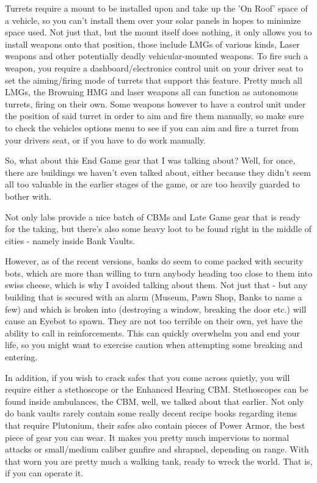 Turrets require a mount to be installed upon and take up the 'On Roof' space of a vehicle, so you can't install them over your solar panels in hopes to minimize space used. Not just that, but the mount itself does nothing, it only allows you to install weapons onto that position, those include LMGs of various kinds, Laser weapons and other potentially deadly vehicular-mounted weapons. To fire such a weapon, you require a dashboard/electronics control unit on your driver seat to set the aiming/firing mode of turrets that support this feature. Pretty much all LMGs, the Browning HMG and laser weapons all can function as autonomous turrets, firing on their own. Some weapons however to have a control unit under the position of said turret in order to aim and fire them manually, so make sure to check the vehicles options menu to see if you can aim and fire a turret from your drivers seat, or if you have to do work manually.

So, what about this End Game gear that I was talking about? Well, for once, there are buildings we haven't even talked about, either because they didn't seem all too valuable in the earlier stages of the game, or are too heavily guarded to bother with.

Not only labs provide a nice batch of CBMs and Late Game gear that is ready for the taking, but there's also some heavy loot to be found right in the middle of cities - namely inside Bank Vaults.

However, as of the recent versions, banks do seem to come packed with security bots, which are more than willing to turn anybody heading too close to them into swiss cheese, which is why I avoided talking about them. Not just that - but any building that is secured with an alarm (Museum, Pawn Shop, Banks to name a few) and which is broken into (destroying a window, breaking the door etc.) will cause an Eyebot to spawn. They are not too terrible on their own, yet have the ability to call in reinforcements. This can quickly overwhelm you and end your life, so you might want to exercise caution when attempting some breaking and entering.

In addition, if you wish to crack safes that you come across quietly, you will require either a stethoscope or the Enhanced Hearing CBM. Stethoscopes can be found inside ambulances, the CBM, well, we talked about that earlier. Not only do bank vaults rarely contain some really decent recipe books regarding items that require Plutonium, their safes also contain pieces of Power Armor, the best piece of gear you can wear. It makes you pretty much impervious to normal attacks or small/medium caliber gunfire and shrapnel, depending on range. With that worn you are pretty much a walking tank, ready to wreck the world. That is, if you can operate it.

